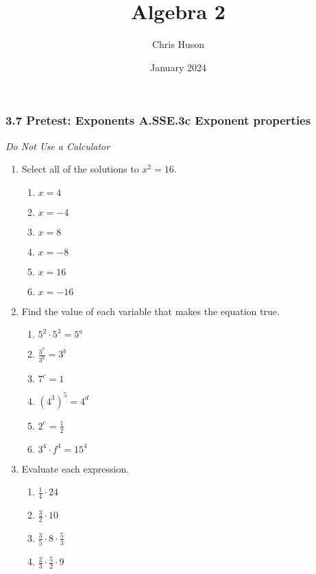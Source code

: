 \documentclass[12pt, twoside]{article}
\title{Algebra 2}
\author{Chris Huson}
\date{January 2024}
\begin{document}
\subsubsection*{3.7 Pretest: Exponents \hfill A.SSE.3c Exponent properties}
\emph{Do Not Use a Calculator}
\begin{enumerate}
\item Select all of the solutions to $x^2=16$.
    \begin{multicols}{2}
    \begin{enumerate}
        \item $x=4$
        \item $x=-4$
        \item $x=8$
        \item $x=-8$
        \item $x=16$
        \item $x=-16$
    \end{enumerate}
    \end{multicols}

    \item Find the value of each variable that makes the equation true.
    \begin{multicols}{2}
    \begin{enumerate}[itemsep=0.5cm]
        \item $5^2 \cdot 5^3 = 5^a$
        \item $\displaystyle \frac{3^7}{3^6} = 3^b$
        \item $7^c=1$
        \item $(4^3)^5 = 4^d$
        \item $\displaystyle 2^e = \frac{1}{2}$
        \item $3^4 \cdot f^4 = 15^4$
    \end{enumerate}
    \end{multicols} \vspace{0.5cm}

\item Evaluate each expression.
    \begin{multicols}{2}
    \begin{enumerate}[itemsep=0.5cm]
        \item $\displaystyle \frac{1}{4} \cdot 24$
        \item $\displaystyle \frac{3}{2} \cdot 10$
        \item $\displaystyle \frac{3}{5} \cdot 8 \cdot \frac{5}{3}$
        \item $\displaystyle \frac{2}{3} \cdot \frac{5}{2} \cdot 9$
    \end{enumerate}
    \end{multicols} \vspace{0.5cm}


\end{enumerate}
\end{document}
